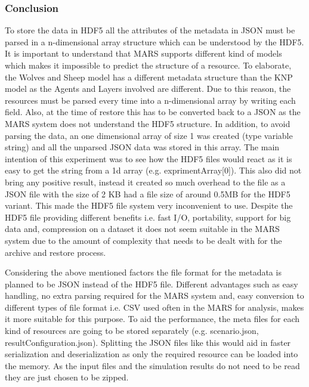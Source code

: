 \subsubsection{Conclusion}
    To store the data in HDF5 all the attributes of the metadata in JSON must be parsed in a n-dimensional array structure which can be understood by the HDF5. 
    It is important to understand that MARS supports different kind of models which makes it impossible to predict the structure of a resource. To elaborate, the
    Wolves and Sheep \cite{HAWHamburgMARS} model has a different metadata structure than the KNP \cite{HAWHamburgMARS} model as the Agents and Layers involved are 
    different. Due to this reason, the resources
    must be parsed every time into a n-dimensional array by writing each field. Also, at the time of restore this has to be converted back 
    to a JSON as the MARS system does not understand the HDF5 structure. In addition, to avoid parsing the data, 
    an one dimensional array of size 1 was created (type variable string) and all the unparsed JSON data
    was stored in this array. The main intention of this experiment was to see how the HDF5 files would react as it is easy to get the string from a 1d array 
    (e.g. exprimentArray[0]). This also did not bring any positive result, instead it created so much overhead to the file as a JSON file with the size of 2 KB
    had a file size of around 0.5MB for the HDF5 variant. This made the HDF5 file system very inconvenient to use.
    Despite the HDF5 file providing different benefits i.e. fast I/O, portability, support for big data and,
    compression on a dataset it does not seem suitable in the MARS system due to the amount of complexity that needs to be dealt with for the archive and restore process.
    

    Considering the above mentioned factors the file format for the metadata is planned to be JSON instead of the HDF5 file. Different advantages such as easy 
    handling, no extra parsing
    required for the MARS system and, easy conversion to different types of file format i.e. CSV used often in the MARS for analysis, makes it more suitable for this purpose. 
    To aid the performance, the meta files for each kind of resources
    are going to be stored separately (e.g. scenario.json, resultConfiguration.json). Splitting the JSON files like this would aid in faster serialization and 
    deserialization as only the required resource can be loaded into the memory. As the input files and the simulation results do not need to be read they are just chosen to be zipped.

